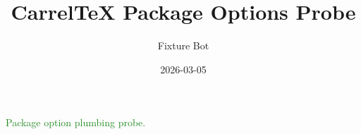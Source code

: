 \documentclass{article}
\title{CarrelTeX Package Options Probe}
\author{Fixture Bot}
\date{2026-03-05}
\begin{document}
\maketitle

\textcolor{ForestGreen}{Package option plumbing probe.}
\end{document}
